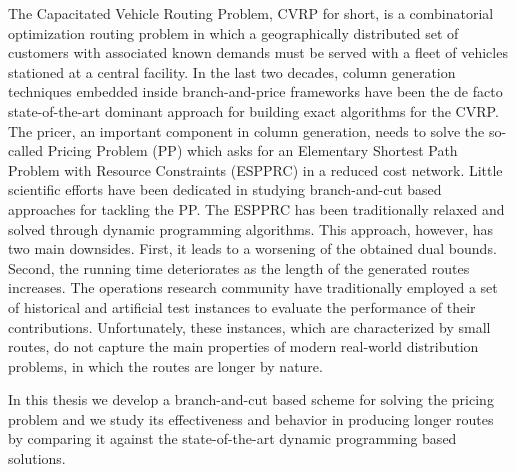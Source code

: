 \noindent The Capacitated Vehicle Routing Problem, CVRP for short,
is a combinatorial optimization routing problem in which
a geographically distributed set of
customers with associated known demands must be served with a fleet of vehicles
stationed at a central facility.
In the last two decades,
column generation techniques embedded inside branch-and-price frameworks
have been the de facto state-of-the-art dominant approach
for building exact algorithms for the CVRP.
The pricer, an important component in column generation, needs to solve
the so-called Pricing Problem (PP) which asks for an
Elementary Shortest Path Problem with Resource Constraints (ESPPRC)
in a reduced cost network.
Little scientific efforts have been dedicated in studying
branch-and-cut based approaches for tackling the PP.
The ESPPRC has been traditionally relaxed and solved through dynamic programming
algorithms. This approach, however, has two main downsides.
First, it leads to a worsening of the obtained dual bounds.
Second, the running time deteriorates as
the length of the generated routes increases.
The operations research community have traditionally employed
a set of historical and artificial test instances to evaluate
the performance of their contributions.
Unfortunately, these instances, which are characterized by small routes,
do not capture the main properties of modern real-world distribution
problems, in which the routes are longer by nature.

\noindent In this thesis we develop
a branch-and-cut based scheme for solving the pricing problem
and we study its effectiveness and behavior in producing longer routes
by comparing it against the state-of-the-art dynamic programming based solutions.
